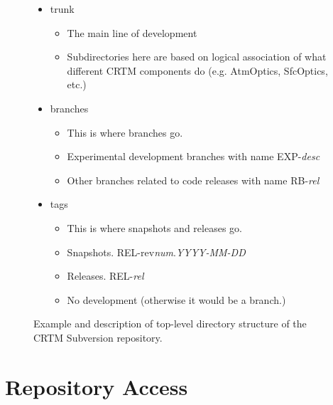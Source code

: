 \begin{figure}[htp]
\begin{minipage}[b]{.475\textwidth}
\begin{itemize}
      \item trunk
        \begin{itemize}
          \item The main line of development
          \item Subdirectories here are based on logical association of what different CRTM components do (e.g. AtmOptics, SfcOptics, etc.)
        \end{itemize}

      \item branches
        \begin{itemize}
          \item This is where branches go.
          \item Experimental development branches with name \textsf{EXP-}\emph{desc}
          \item Other branches related to code releases with name \textsf{RB}-\emph{rel}
        \end{itemize}

      \item tags
        \begin{itemize}
          \item This is where snapshots and releases go.
          \item Snapshots. \textsf{REL-rev}\emph{num}.\emph{YYYY-MM-DD}
          \item Releases. \textsf{REL-}\emph{rel}
          \item No development (otherwise it would be a branch.)
        \end{itemize}
    \end{itemize}
  \end{minipage}
  \caption{Example and description of top-level directory structure of the CRTM Subversion repository.}
  \label{fig:CRTM_Repository_Structure}
  \hfill
\end{figure}


\section{Repository Access}
